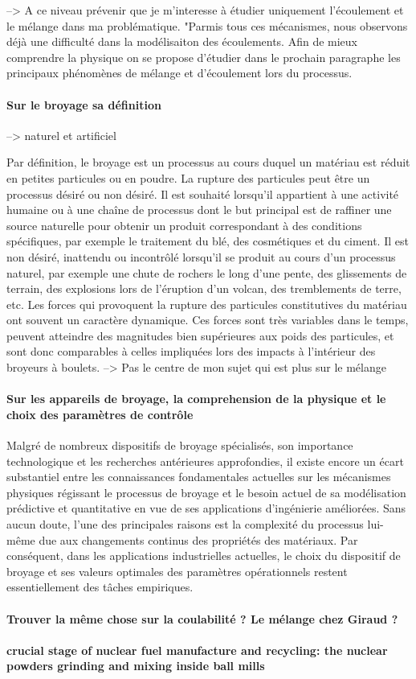 --> A ce niveau prévenir que je m'interesse à étudier uniquement l'écoulement et le mélange dans ma problématique.
"Parmis tous ces mécanismes, nous observons déjà une difficulté dans la modélisaiton des écoulements. Afin de mieux comprendre la physique on se propose d'étudier dans le prochain paragraphe les principaux phénomènes de mélange et d'écoulement lors du processus.


\paragraph{Sur le broyage sa définition} --> naturel et artificiel

Par définition, le broyage est un processus au cours duquel un matériau est réduit en petites particules ou en poudre. La rupture des particules peut être un processus désiré ou non désiré. Il est souhaité lorsqu'il appartient à une activité humaine ou à une chaîne de processus dont le but principal est de raffiner une source naturelle pour obtenir un produit correspondant à des conditions spécifiques, par exemple le traitement du blé, des cosmétiques et du ciment. Il est non désiré, inattendu ou incontrôlé lorsqu'il se produit au cours d'un processus naturel, par exemple une chute de rochers le long d'une pente, des glissements de terrain, des explosions lors de l'éruption d'un volcan, des tremblements de terre, etc. Les forces qui provoquent la rupture des particules constitutives du matériau ont souvent un caractère dynamique. Ces forces sont très variables dans le temps, peuvent atteindre des magnitudes bien supérieures aux poids des particules, et sont donc comparables à celles impliquées lors des impacts à l'intérieur des broyeurs à boulets. --> Pas le centre de mon sujet qui est plus sur le mélange

\paragraph{Sur les appareils de broyage, la comprehension de la physique et le choix des paramètres de contrôle}

Malgré de nombreux dispositifs de broyage spécialisés, son importance technologique et les recherches antérieures approfondies, il existe encore un écart substantiel entre les connaissances fondamentales actuelles sur les mécanismes physiques régissant le processus de broyage et le besoin actuel de sa modélisation prédictive et quantitative en vue de ses applications d'ingénierie améliorées. Sans aucun doute, l'une des principales raisons est la complexité du processus lui-même due aux changements continus des propriétés des matériaux. Par conséquent, dans les applications industrielles actuelles, le choix du dispositif de broyage et ses valeurs optimales des paramètres opérationnels restent essentiellement des tâches empiriques.

\paragraph{Trouver la même chose sur la coulabilité ? Le mélange chez Giraud ?}

\paragraph{crucial stage of nuclear fuel manufacture and recycling: the nuclear powders grinding and mixing inside ball mills}





